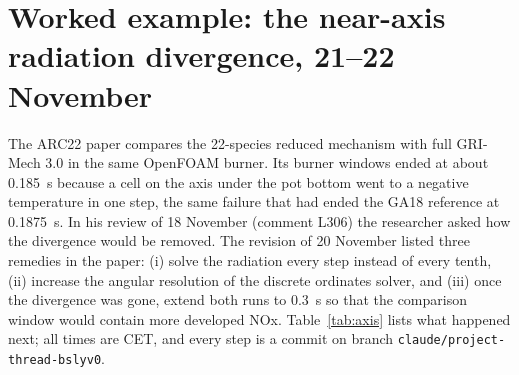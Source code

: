 \documentclass[preprint,review,12pt]{elsarticle}
\begin{document}
\section{Worked example: the near-axis radiation divergence, 21--22 November}\label{sec:example}

The ARC22 paper compares the 22-species reduced mechanism with full GRI-Mech 3.0 in the same OpenFOAM burner. Its
burner windows ended at about 0.185~s because a cell on the axis under the pot bottom went to a negative temperature in
one step, the same failure that had ended the GA18 reference at 0.1875~s. In his review of 18 November (comment L306)
the researcher asked how the divergence would be removed. The revision of 20 November listed three remedies in the
paper: (i) solve the radiation every step instead of every tenth, (ii) increase the angular resolution of the discrete
ordinates solver, and (iii) once the divergence was gone, extend both runs to 0.3~s so that the comparison window
would contain more developed NOx. Table~\ref{tab:axis} lists what happened next; all times are CET, and every step is
a commit on branch \texttt{claude/project-thread-bslyv0}.
\end{document}
